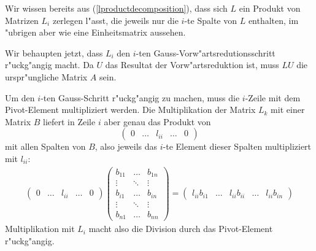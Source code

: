 Wir wissen bereits aus (\ref{lproductdecomposition}), dass sich $L$
ein Produkt von Matrizen $L_i$ zerlegen l"asst, die jeweils nur
die $i$-te Spalte von $L$ enthalten, im "ubrigen aber wie eine Einheitsmatrix
aussehen.

Wir behaupten jetzt, dass $L_i$ den $i$-ten Gauss-Vorw"artsredutionsschritt
r"uck\-g"angig macht. Da $U$ das Resultat der Vorw"artsreduktion ist, 
muss $LU$ die urspr"ungliche Matrix $A$ sein. 

Um den $i$-ten Gauss-Schritt r"uckg"angig zu machen, muss die
$i$-Zeile mit dem Pivot-Element multipliziert werden. Die Multiplikation
der Matrix $L_k$ mit einer Matrix $B$ liefert in Zeile $i$ aber genau das Produkt
von
\[
\begin{pmatrix}
0&\dots&l_{ii}&\dots &0
\end{pmatrix}
\]
mit allen Spalten von $B$, also jeweils das $i$-te Element dieser
Spalten multipliziert mit $l_{ii}$:
\begin{align*}
\begin{pmatrix}
0&\dots&l_{ii}&\dots &0
\end{pmatrix}
\begin{pmatrix}
b_{11}&\dots &b_{1n}\\
\vdots&\ddots&\vdots\\
b_{i1}&\dots &b_{in}\\
\vdots&\ddots&\vdots\\
b_{n1}&\dots &b_{nn}
\end{pmatrix}
=
\begin{pmatrix}
l_{ii}b_{i1}&\dots &l_{ii}b_{ii}&\dots &l_{ii}b_{in}
\end{pmatrix}
\end{align*}
Multiplikation mit $L_i$ macht
also die Division durch das Pivot-Element r"uckg"angig.

